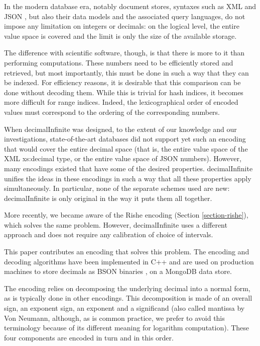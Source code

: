 \documentclass{acm_proc_article-sp}
\begin{document}
In the modern database era, notably document stores, syntaxes such as XML \cite{XML} and JSON \cite{JSON}, but also their data models and the associated query languages, do not impose any limitation on integers or decimals: on the logical level, the entire value space is covered and the limit is only the size of the available storage.

The difference with scientific software, though, is that there is more to it than performing computations. These numbers need to be efficiently stored and retrieved, but most importantly, this must be done in such a way that they can be indexed. For efficiency reasons, it is desirable that this comparison can be done without decoding them. While this is trivial for hash indices, it becomes more difficult for range indices. Indeed, the lexicographical order of encoded values must correspond to the ordering of the corresponding numbers.

When decimalInfinite was designed, to the extent of our knowledge and our investigations, state-of-the-art databases did not support yet such an encoding that would cover the entire decimal space (that is, the entire value space of the XML xs:decimal type, or the entire value space of JSON numbers). However, many encodings existed that have some of the desired properties. decimalInfinite unifies the ideas in these encodings in such a way that all these properties apply simultaneously. In particular, none of the separate schemes used are new: decimalInfinite is only original in the way it puts them all together.

More recently, we became aware of the Rishe encoding (Section \ref{section-rishe}), which solves the same problem. However, decimalInfinite uses a different approach and does not require any calibration of choice of intervals.

This paper contributes an encoding that solves this problem. The encoding and decoding algorithms have been implemented in C++ and are used on production machines to store decimals as BSON binaries \cite{BSON}, on a MongoDB \cite{MongoDB} data store.

The encoding relies on decomposing the underlying decimal into a normal form, as is typically done in other encodings. This decomposition is made of an overall sign, an exponent sign, an exponent and a significand (also called mantissa by Von Neumann, although, as is common practice, we prefer to avoid this terminology because of its different meaning for logarithm computation). These four components are encoded in turn and in this order.
\end{document}

